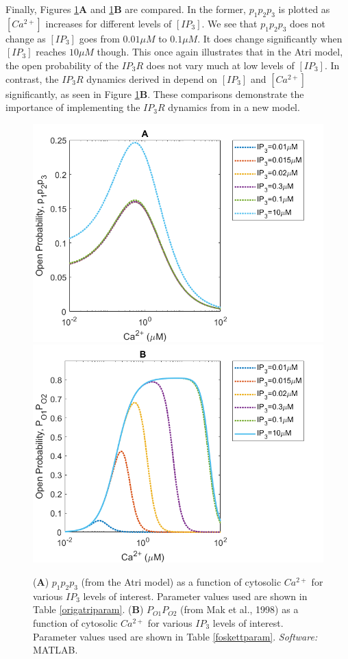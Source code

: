 Finally, Figures \ref{fosketthillfunctionatri}\textbf{A} and \ref{fosketthillfunctionatri}\textbf{B} are compared. In the former, $p_1p_2p_3$ is plotted as $[Ca^{2+}]$ increases for different levels of $[IP_3]$. We see that $p_1p_2p_3$ does not change as $[IP_3]$ goes from $0.01\mu M$ to $0.1\mu M$. It does change significantly when $[IP_3]$ reaches $10 \mu M$ though. This once again illustrates that in the Atri model, the open probability of the $IP_3R$ does not vary much at low levels of $[IP_3]$. In contrast, the $IP_3R$ dynamics derived in  depend on $[IP_3]$ and $[Ca^{2+}]$ significantly, as seen in Figure \ref{fosketthillfunctionatri}\textbf{B}. These comparisons demonstrate the importance of implementing the $IP_3R$ dynamics from  in a new model.


\begin{figure}[h!!!t!!!b!!!p]
  \centering
  \includegraphics[width=0.8\linewidth]{Chapters/5_New_Model/extras/fosketthillfunctionATRI.png}
  \includegraphics[width=0.8\linewidth]{Chapters/5_New_Model/extras/anotherfosketthill.png}
  \caption{(\textbf{A}) $p_1p_2p_3$ (from the Atri model) as a function of cytosolic $Ca^{2+}$ for various $IP_3$ levels of interest. Parameter values used are shown in Table \ref{origatriparam}. (\textbf{B}) $P_{O1}P_{O2}$ (from Mak et al., 1998) as a function of cytosolic $Ca^{2+}$ for various $IP_3$ levels of interest. Parameter values used are shown in Table \ref{foskettparam}. \textit{Software:} MATLAB.}\label{fosketthillfunctionatri}
\end{figure}

